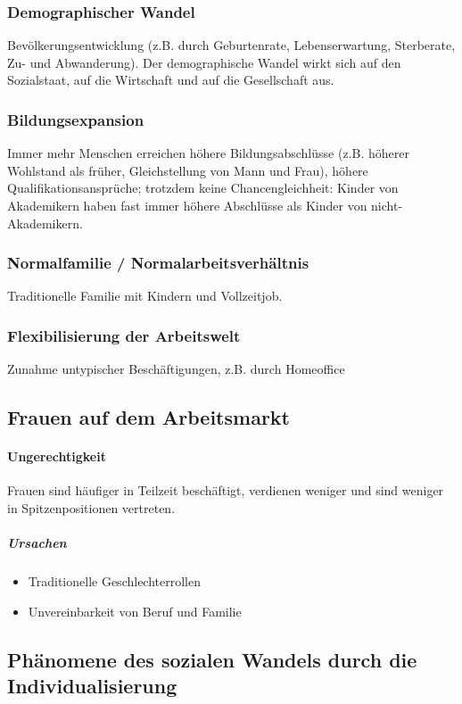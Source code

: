 \documentclass{article}
\begin{document}
	\subsubsection{Demographischer Wandel}
	Bevölkerungsentwicklung (z.B. durch Geburtenrate, Lebenserwartung, Sterberate, Zu- und Abwanderung). Der demographische Wandel wirkt sich auf den Sozialstaat, auf die Wirtschaft und auf die Gesellschaft aus.

	\subsubsection{Bildungsexpansion}
	Immer mehr Menschen erreichen höhere Bildungsabschlüsse (z.B. höherer Wohlstand als früher, Gleichstellung von Mann und Frau), höhere Qualifikationsansprüche; trotzdem keine Chancengleichheit: Kinder von Akademikern haben fast immer höhere Abschlüsse als Kinder von nicht-Akademikern.

	\subsubsection{Normalfamilie / Normalarbeitsverhältnis}
	Traditionelle Familie mit Kindern und Vollzeitjob.

	\subsubsection{Flexibilisierung der Arbeitswelt}
	Zunahme untypischer Beschäftigungen, z.B. durch Homeoffice

	\subsection{Frauen auf dem Arbeitsmarkt}
	\paragraph{Ungerechtigkeit}
	Frauen sind häufiger in Teilzeit beschäftigt, verdienen weniger und sind weniger in Spitzenpositionen vertreten.

	\subparagraph{Ursachen}
	\begin{itemize}
		\item Traditionelle Geschlechterrollen
		\item Unvereinbarkeit von Beruf und Familie
	\end{itemize}

	\subsection{Phänomene des sozialen Wandels durch die Individualisierung}
\end{document}

